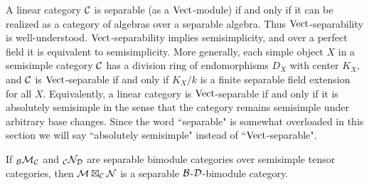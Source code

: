 \documentclass{amsart}
\begin{document}
A linear category $\mathcal C$ is separable (as a $\mathrm{Vect}$-module) if and only if it can be realized as a category of algebras over a separable algebra.  Thus $\mathrm{Vect}$-separability is well-understood.   $\mathrm{Vect}$-separability implies semisimplicity, and over a perfect field it is equivalent to semisimplicity.  More generally, each simple object $X$ in a semisimple category $\mathcal C$ has a division ring of endomorphisms $D_X$ with center $K_X$, and $\mathcal C$ is $\mathrm{Vect}$-separable if and only if $K_X/k$ is a finite separable field extension for all $X$.  Equivalently, a linear category is $\mathrm{Vect}$-separable if and only if it is absolutely semisimple in the sense that the category remains semisimple under arbitrary base changes.  Since the word ``separable" is somewhat overloaded in this section we will say ``absolutely semisimple" instead of ``$\mathrm{Vect}$-separable".

\begin{theorem} \label{thm:compositeOfSep}
	If ${}_\mathcal B\mathcal M_\mathcal C$ and ${}_\mathcal C\mathcal N_\mathcal D$ are separable bimodule categories over semisimple tensor categories, then $\mathcal M \boxtimes_{\mathcal C} \mathcal N$ is a separable $\mathcal B$-$\mathcal D$-bimodule category.
\end{theorem}
\end{document}
